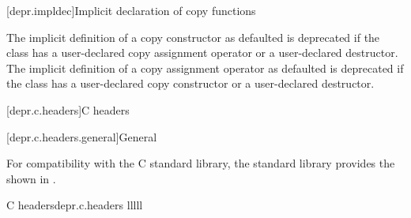[depr.impldec]{Implicit declaration of copy functions}

\pnum
The implicit definition of a copy constructor
as defaulted is deprecated if the class has
a user-declared copy assignment operator or
a user-declared destructor.
The implicit definition of a copy assignment operator
as defaulted is deprecated if the class has
a user-declared copy constructor or
a user-declared destructor.

[depr.c.headers]{C headers}

[depr.c.headers.general]{General}

\pnum
For compatibility with the
%
C standard library, the \Cpp{} standard library provides
the  shown in .

\begin{multicolfloattable}{C headers}{depr.c.headers}
{lllll}
 \\
 \\
 \\
 \\
 \\
 \\
\columnbreak
{} \\
 \\
 \\
 \\
 \\
 \\
\columnbreak
{} \\
 \\
 \\
 \\
 \\
 \\
\columnbreak
{} \\
 \\
 \\
 \\
 \\
 \\
\columnbreak
{} \\
 \\
\end{multicolfloattable}


